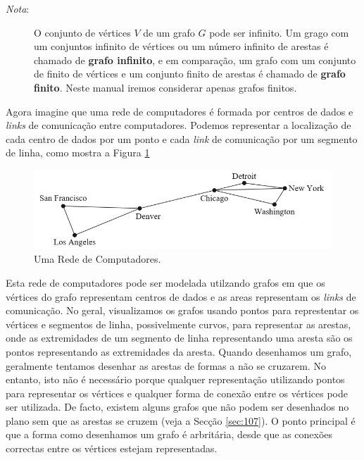 \begin{description}
\item[\emph{Nota}:] O conjunto de vértices $V$ de um grafo $G$ pode ser
infinito. Um grago com um conjuntos infinito de vértices ou um
número infinito de arestas é chamado de \textbf{grafo infinito}, e em comparação, um grafo com
um conjunto de finito de vértices e um conjunto finito de arestas é chamado de
\textbf{grafo finito}. Neste manual iremos considerar apenas grafos finitos.
\end{description}

Agora imagine que uma rede de computadores é formada por centros de dados e
\textit{links} de comunicação entre computadores. Podemos representar a
localização de cada centro de dados por um ponto e cada \textit{link} de
comunicação por um segmento de linha, como mostra a Figura \ref{fig51}

\begin{figure}[H]
	\centering
	\includegraphics[scale=1]{chapter/imagens/51}
	\caption{Uma Rede de Computadores.}
	\label{fig51}
\end{figure}

Esta rede de computadores pode ser modelada utilzando grafos em que os vértices
do grafo representam centros de dados e as areas representam os \textit{links}
de comunicação. No geral, visualizamos os grafos usando pontos para represtentar
os vértices e segmentos de linha, possivelmente curvos, para representar as
arestas, onde as extremidades de um segmento de linha representando uma aresta
são os pontos representando as extremidades da aresta. Quando desenhamos um
grafo, geralmente tentamos desenhar as arestas de formas a não se cruzarem. No
entanto, isto não é necessário porque qualquer representação utilizando pontos
para representar os vértices e qualquer forma de conexão entre os vértices pode
ser utilizada. De facto, existem alguns grafos que não podem ser desenhados no
plano sem que as arestas se cruzem (veja a Secção \ref{sec:107}). O ponto
principal é que a forma como desenhamos um grafo é arbritária, desde que as
conexões correctas entre os vértices estejam representadas.

